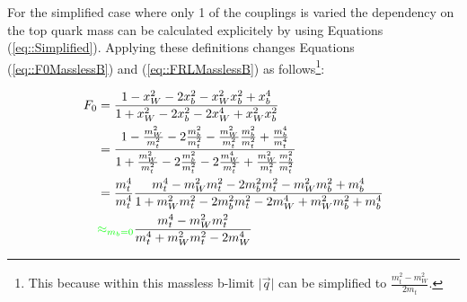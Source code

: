 For the simplified case where only 1 of the couplings is varied the dependency on the top quark mass can be calculated explicitely by using Equations (\ref{eq::Simplified}). Applying these definitions changes Equations (\ref{eq::F0MasslessB}) and (\ref{eq::FRLMasslessB}) as follows\footnote{This because within this massless b-limit $\vert \vec{q} \vert$ can be simplified to $\frac{m_{t}^{2} - m_{W}^{2}}{2m_{t}}$.}:

\begin{subequations}
 \begin{align*}
  F_{0} & = \frac{1 - x_{W}^{2} - 2x_{b}^{2} -x_{W}^{2} x_{b}^{2} + x_{b}^{4}}{1 + x_{W}^{2} - 2x_{b}^{2} - 2 x_{W}^{4} + x_{W}^{2} x_{b}^{2}} \\
        & = \frac{1 - \frac{m_{W}^{2}}{m_{t}^{2}} - 2 \frac{m_{b}^{2}}{m_{t}^{2}} - \frac{m_{W}^{2}}{m_{t}^{2}} \frac{m_{b}^{2}}{m_{t}^{2}} + \frac{m_{b}^{4}}{m_{t}^{4}}}{1 + \frac{m_{W}^{2}}{m_{t}^{2}} - 2 \frac{m_{b}^{2}}{m_{t}^{2}} - 2 \frac{m_{W}^{4}}{m_{t}^{2}} + \frac{m_{W}^{2}}{m_{t}^{2}} \frac{m_{b}^{2}}{m_{t}^{2}}} \\
        & = \frac{m_{t}^{4}}{m_{t}^{4}} \frac{m_{t}^{4} - m_{W}^{2} m_{t}^{2} - 2m_{b}^{2} m_{t}^{2} - m_{W}^{2} m_{b}^{2} + m_{b}^{4}}{1 + m_{W}^{2} m_{t}^{2} - 2 m_{b}^{2} m_{t}^{2} - 2 m_{W}^{4} + m_{W}^{2} m_{b}^{2} + m_{b}^{4}} \\
        & \textcolor{green}{\approx_{m_{b} = 0}} \frac{m_{t}^{4} - m_{W}^{2} m_{t}^{2}}{m_{t}^{4} + m_{W}^{2} m_{t}^{2} - 2m_{W}^{4}}
 \end{align*}
\end{subequations}

